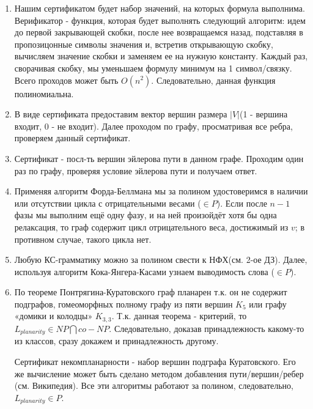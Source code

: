 \documentclass[a4paper, 12pt]{article}
\begin{document}
\begin{enumerate}

\item Нашим сертификатом будет набор значений, на которых формула выполнима. Верификатор - функция, которая будет выполнять следующий алгоритм: идем до первой закрывающей скобки, после нее возвращаемся назад, подставляя в пропозицонные символы значения и, встретив открывающую скобку, вычисляем значение скобки и заменяем ее на нужную константу. Каждый раз, сворачивая скобку, мы уменьшаем формулу минимум на 1 символ/связку. Всего проходов может быть $O(n^2)$. Следовательно, данная функция полиномиальна.


\item В виде сертификата предоставим вектор вершин размера $|V|$(1 - вершина входит, 0 - не входит). Далее проходом по графу, просматривая все ребра, проверяем данный сертификат.



\item Сертификат - посл-ть вершин эйлерова пути в данном графе. Проходим один раз по графу, проверяя условие эйлерова пути и получаем ответ.


\item Применяя алгоритм Форда-Беллмана мы за полином удостоверимся в наличии или отсутствии цикла с отрицательными весами ($\in P$). Если после $n-1$ фазы мы выполним ещё одну фазу, и на ней произойдёт хотя бы одна релаксация, то граф содержит цикл отрицательного веса, достижимый из $v$; в противном случае, такого цикла нет.


\item Любую КС-грамматику можно за полином свести к НФХ(см. 2-ое ДЗ). Далее, используя алгоритм Кока-Янгера-Касами узнаем выводимость слова ($\in P$).


\item По теореме Понтрягина-Куратовского граф планарен т.к. он не содержит подграфов, гомеоморфных полному графу из пяти вершин $K_5$ или графу «домики и колодцы» $K_{3,3}$. Т.к. данная теорема - критерий, то $L_{planarity} \in NP \bigcap co-NP$. Следовательно, доказав принадлежность какому-то из классов, сразу докажем и принадлежность другому.

Сертификат некомпланарности - набор вершин подграфа Куратовского. Его же вычисление может быть сделано методом добавления пути/вершин/ребер (см. Википедия). Все эти алгоритмы работают за полином, следовательно, $L_{planarity} \in P$.

\end{enumerate}
\end{document}
